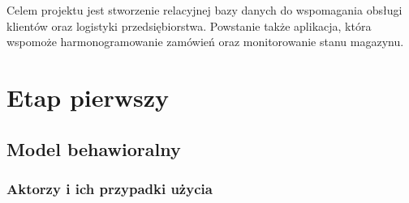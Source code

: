 \documentclass[10pt]{article}
\begin{document}
Celem projektu jest stworzenie relacyjnej bazy danych do wspomagania obsługi klientów oraz logistyki przedsiębiorstwa. Powstanie także aplikacja, która wspomoże harmonogramowanie zamówień oraz monitorowanie stanu magazynu.

\pagebreak %

\section{Etap pierwszy}

\subsection{Model behawioralny}

\subsubsection{Aktorzy i ich przypadki użycia}
\end{document}
